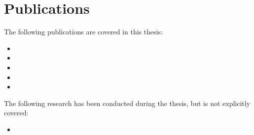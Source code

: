\cleardoublepage
\chapter*{Publications}

The following publications are covered in this thesis:
\begin{itemize}
\item {}
\item {}
\item {}
\item {}
\item {}
\end{itemize}

The following research has been conducted during the thesis, but is not explicitly covered:
\begin{itemize}
\item {}
\end{itemize}

